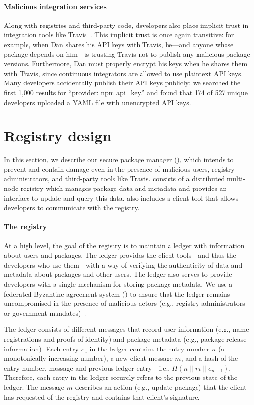 \paragraph{Malicious integration services}
Along with registries and third-party code, developers also place implicit trust in
integration tools like Travis~\cite{travis}. This implicit trust is once again
transitive: for example, when Dan shares his API keys with Travis, he---and
anyone whose package depends on him---is trusting Travis not to publish any
malicious package versions. Furthermore, Dan must properly encrypt his keys
when he shares them with Travis, since continuous integrators are allowed to
use plaintext API keys. Many developers accidentally publish their
API keys publicly: we searched the first 1,000 \gh results for ``provider: npm api\_key.''
and found that 174 of 527 unique \gh developers uploaded a YAML file
with unencrypted API keys. 


\section{Registry design}\label{design}
In this section, we describe our secure package manager (\spam), which intends to
prevent and contain damage even in the presence of malicious users, registry
administrators, and third-party tools like Travis. \spam consists of
a distributed multi-node registry which manages package data and metadata and
provides an interface to update and query this data. \spam also includes a
client tool that allows developers to communicate with the registry.

\paragraph{The registry}
At a high level, the goal of the registry is to maintain a ledger
with information about users and packages. The ledger provides
the client tools---and thus the developers who use them---with a way of
verifying the authenticity of data and metadata about packages and other users.
The ledger also serves to provide developers with a single
mechanism for storing package metadata. We use a federated Byzantine
agreement system (\fbas) to ensure that the ledger remains uncompromised in the
presence of malicious actors (e.g., registry administrators or government
mandates)~\cite{stellar}.

The ledger consists of different messages that record
user information (e.g., name registrations and proofs of identity) and
package metadata (e.g., package release information). 
Each entry $e_n$ in the ledger contains the entry number $n$ (a monotonically
increasing number), a new client message $m$, and a hash of the entry number, message and previous ledger entry---i.e., $H(n\|m\|e_{n-1})$.
Therefore, each entry in the ledger securely refers to the previous state of the
ledger.  The message $m$ describes an action (e.g., update package) that the client
has requested of the registry and contains that client's signature. 

